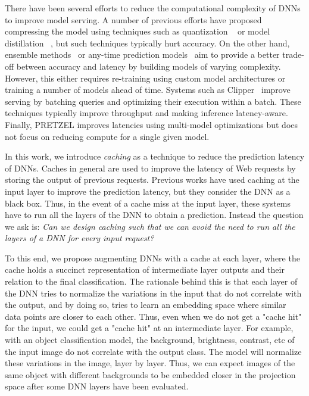 \documentclass[letterpaper,twocolumn,10pt]{article}
\begin{document}
There have been several efforts to reduce the computational complexity of DNNs to improve model serving. A number of previous efforts have proposed compressing the model using techniques such as quantization ~\cite{DBLP:journals/corr/CourbariauxB16,DBLP:journals/corr/CaiHSV17} or model distillation ~\cite{hinton2015distilling}, but such techniques typically hurt accuracy. On the other hand, ensemble methods~\cite{mcdnnPaper} or any-time prediction models~\cite{DBLP:journals/corr/HuangCLWMW17} aim to provide a better trade-off between accuracy and latency by building models of varying complexity. However, this either requires re-training using custom model architectures or training a number of models ahead of time. Systems such as Clipper~\cite{crankshaw2017clipper} improve serving by batching queries and optimizing their execution within a batch. These techniques typically improve throughput and making inference latency-aware. Finally, PRETZEL\cite{pretzel} improves latencies using multi-model optimizations but does not focus on reducing compute for a single given model.







In this work, we introduce \emph{caching} as a technique to reduce the prediction latency of DNNs. Caches in general are used to improve the latency of Web requests by storing the output of previous requests. Previous works \cite{crankshaw2017clipper} have used caching at the input layer  to improve the prediction latency, but they consider the DNN as a black box. Thus, in the event of a cache miss at the input layer, these systems have to run all the layers of the DNN to obtain a prediction. Instead the question we ask is: \emph{Can we design caching such that we can avoid the need to run all the layers of a DNN for every input request?}

To this end, we propose augmenting DNNs with a cache at each layer, where the cache holds a succinct representation of intermediate layer outputs and their relation to the final classification. The rationale behind this is that each layer of the DNN tries to normalize the variations in the input that do not correlate with the output, and by doing so, tries to learn an embedding space where similar data points are closer to each other. Thus, even when we do not get a "cache hit" for the input, we could get a "cache hit" at an intermediate layer. For example, with an object classification model, the background, brightness, contrast, etc of the input image do not correlate with the output class. The model will normalize these variations in the image, layer by layer. Thus, we can expect images of the same object with different backgrounds to be embedded closer in the projection space after some DNN layers have been evaluated.
\end{document}

